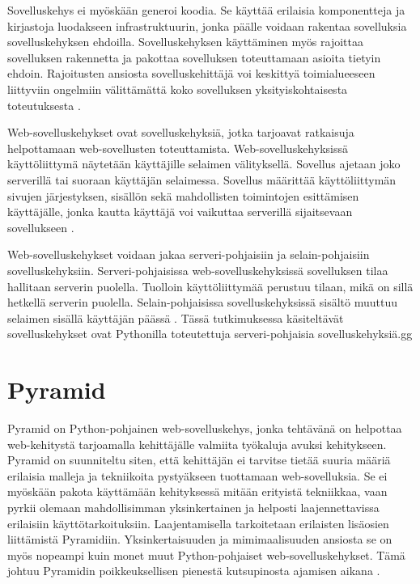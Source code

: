 \documentclass[utf8]{gradu3}
\begin{document}
Sovelluskehys ei myöskään generoi koodia. Se käyttää erilaisia komponentteja ja kirjastoja luodakseen infrastruktuurin, jonka päälle voidaan rakentaa sovelluksia sovelluskehyksen ehdoilla. Sovelluskehyksen käyttäminen myös rajoittaa sovelluksen rakennetta ja pakottaa sovelluksen toteuttamaan asioita tietyin ehdoin. Rajoitusten ansiosta sovelluskehittäjä voi keskittyä toimialueeseen liittyviin ongelmiin välittämättä koko sovelluksen yksityiskohtaisesta toteutuksesta \parencite{towards_framework}.

Web-sovelluskehykset ovat sovelluskehyksiä, jotka tarjoavat ratkaisuja helpottamaan web-sovellusten toteuttamista. Web-sovelluskehyksissä käyttöliittymä näytetään käyttäjille selaimen välityksellä. Sovellus ajetaan joko serverillä tai suoraan käyttäjän selaimessa. Sovellus määrittää käyttöliittymän sivujen järjestyksen, sisällön sekä mahdollisten toimintojen esittämisen käyttäjälle, jonka kautta käyttäjä voi vaikuttaa serverillä sijaitsevaan sovellukseen \parencite{vosloo}.

Web-sovelluskehykset voidaan jakaa serveri-pohjaisiin ja selain-pohjaisiin sovelluskehyksiin. Serveri-pohjaisissa web-sovelluskehyksissä sovelluksen tilaa hallitaan serverin puolella. Tuolloin käyttöliittymää perustuu tilaan, mikä on sillä hetkellä serverin puolella. Selain-pohjaisissa sovelluskehyksissä sisältö muuttuu selaimen sisällä käyttäjän päässä \parencite{vosloo}. Tässä tutkimuksessa käsiteltävät sovelluskehykset ovat Pythonilla toteutettuja serveri-pohjaisia sovelluskehyksiä.gg

\section{Pyramid}

Pyramid on Python-pohjainen web-sovelluskehys, jonka tehtävänä on helpottaa web-kehitystä tarjoamalla
kehittäjälle valmiita työkaluja avuksi kehitykseen. Pyramid on suunniteltu siten, että kehittäjän ei tarvitse tietää suuria määriä erilaisia malleja ja tekniikoita pystyäkseen tuottamaan web-sovelluksia. Se ei myöskään pakota käyttämään kehityksessä mitään erityistä tekniikkaa, vaan pyrkii olemaan mahdollisimman yksinkertainen ja helposti laajennettavissa erilaisiin käyttötarkoituksiin. Laajentamisella tarkoitetaan erilaisten lisäosien liittämistä Pyramidiin. Yksinkertaisuuden ja mimimaalisuuden ansiosta se on myös nopeampi kuin monet muut Python-pohjaiset web-sovelluskehykset. Tämä johtuu Pyramidin poikkeuksellisen pienestä kutsupinosta ajamisen aikana \parencite{pyramid_intr}. 
\end{document}
